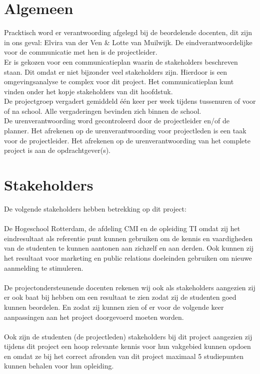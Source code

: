 \documentclass[oneside]{book}
\begin{document}
\section{Algemeen}
Pracktisch word er verantwoording afgelegd bij de beordelende docenten, dit zijn in ons geval: Elvira van der Ven \& Lotte van Muilwijk.
De eindverantwoordelijke voor de communicatie met hen is de projectleider.\\
Er is gekozen voor een communicatieplan waarin de stakeholders beschreven staan.
Dit omdat er niet bijzonder veel stakeholders zijn.
Hierdoor is een omgevingsanalyse te complex voor dit project.
Het communicatieplan kunt vinden onder het kopje stakeholders van dit hoofdstuk.\\
De projectgroep vergadert gemiddeld één keer per week tijdens tussenuren of voor of na school.
Alle vergaderingen bevinden zich binnen de school.\\
De urenverantwoording word gecontroleerd door de projectleider en/of de planner.
Het afrekenen op de urenverantwoording voor projectleden is een taak voor de projectleider.
Het afrekenen op de urenverantwoording van het complete project is aan de opdrachtgever(s).
\section{Stakeholders}
De volgende stakeholders hebben betrekking op dit project:\\
\\
De Hogeschool Rotterdam, de afdeling CMI en de opleiding TI omdat zij het eindresultaat als
referentie punt kunnen gebruiken om de kennis en vaardigheden van de studenten te kunnen
aantonen aan zichzelf en aan derden.
Ook kunnen zij het resultaat voor marketing en public relations doeleinden gebruiken om nieuwe
aanmelding te stimuleren.\\
\\
De projectondersteunende docenten rekenen wij ook als stakeholders aangezien zij er ook baat bij hebben om een resultaat te zien zodat zij de studenten goed kunnen beordelen.
En zodat zij kunnen zien of er voor de volgende keer aanpassingen aan het project doorgevoerd
moeten worden.\\
\\
Ook zijn de studenten (de projectleden) stakeholders bij dit project aangezien zij tijdens dit project
een hoop relevante kennis voor hun vakgebied kunnen opdoen en omdat ze bij het correct afronden
van dit project maximaal 5 studiepunten kunnen behalen voor hun opleiding.
\clearpage
\end{document}
